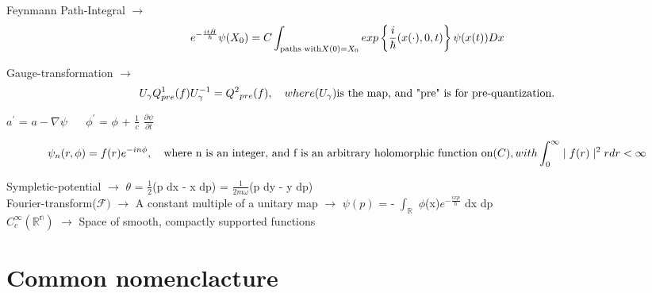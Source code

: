 \documentclass[a4paper, 10pt, onepage]{elegantbook}
\begin{document}
\begin{note}
Feynmann Path-Integral $\longrightarrow$  \\
\begin{equation}
e^{- \frac{i t \hat {H}}{\hbar}} \psi (X_0) = C \int_{\text{paths with} \\ X(0)=X_0} exp\left\{ \frac{i}{\hbar}(x(\cdot),0,t) \right\} \psi(x(t)) Dx
\end{equation}
 
Gauge-transformation $\longrightarrow$ \\
\begin{equation} \label{eq:Gauge-transformation}
U_\gamma Q^{1}_{pre}(f)U^{-1}_{\gamma} = Q^{2}{_{pre}}(f), \quad where (U_\gamma) \text{is the map, and "pre" is for pre-quantization\index{pre-quantization}}.
\end{equation}

$a^{\prime}$ = $a - \nabla \psi$ $\quad$  $\phi^{\prime}$ = $\phi$ + $\frac{1}{c}$ $\frac{\partial \psi}{\partial t}$


\begin{equation}
\psi_n(r,\phi) = f(r) e^{-i n\phi},\quad \text{where n is an integer, and f is an arbitrary holomorphic function\index{holomorphic function} on} \mathbb (C), with
\int_0^{\infty}\mid f(r)\mid^2r dr < \infty
\end{equation}
 
Sympletic-potential $\longrightarrow$ $\theta$ = $\frac{1}{2}$(p dx - x dp) = $\frac{1}{{2m} \omega}$(p dy - y dp)  \\
  
Fourier-transform($\mathcal{F})$ $\longrightarrow$ A constant multiple of a unitary map $\longrightarrow$ $\psi(p)$ = - $\int_\mathbb R$ $\phi$(x)$e^{- \frac{{ixp}}{\hbar}}$ dx dp  \\
  
$C_c^{\infty}(\mathbb {R^n})$ $\longrightarrow$ Space of smooth, compactly supported functions \\
\end{note}

\section{\textbf{Common nomenclacture}}
\end{document}
